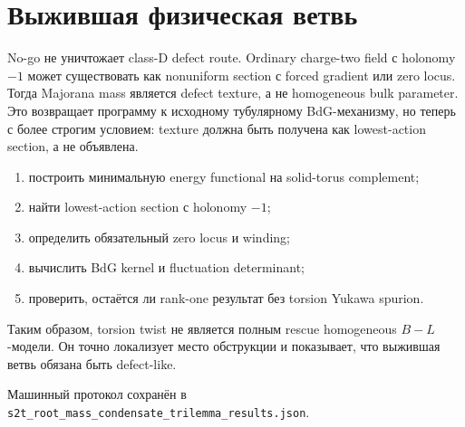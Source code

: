 \section{Выжившая физическая ветвь}

No-go не уничтожает class-D defect route. Ordinary charge-two field с
holonomy \(-1\) может существовать как nonuniform section с forced gradient
или zero locus. Тогда Majorana mass является defect texture, а не
homogeneous bulk parameter. Это возвращает программу к исходному
тубулярному BdG-механизму, но теперь с более строгим условием: texture
должна быть получена как lowest-action section, а не объявлена.

\begin{protocol}
\begin{enumerate}
 \item построить минимальную energy functional на solid-torus complement;
 \item найти lowest-action section с holonomy \(-1\);
 \item определить обязательный zero locus и winding;
 \item вычислить BdG kernel и fluctuation determinant;
 \item проверить, остаётся ли rank-one результат без torsion Yukawa spurion.
\end{enumerate}
\end{protocol}

Таким образом, torsion twist не является полным rescue homogeneous
\(B-L\)-модели. Он точно локализует место обструкции и показывает, что
выжившая ветвь обязана быть defect-like.

Машинный протокол сохранён в
\texttt{s2t\_root\_mass\_condensate\_trilemma\_results.json}.